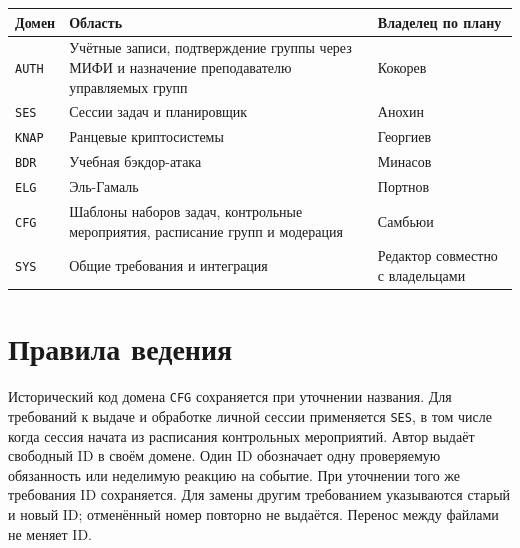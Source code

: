 \documentclass[12pt,a4paper]{article}
\begin{document}
{\def\LTcaptype{none} %
\begin{longtable}[]{@{}
  >{\raggedright\arraybackslash}p{}
  >{\raggedright\arraybackslash}p{}
  >{\raggedright\arraybackslash}p{}@{}}
\toprule\noalign{}
\begin{minipage}[b]{\linewidth}\raggedright
Домен
\end{minipage} & \begin{minipage}[b]{\linewidth}\raggedright
Область
\end{minipage} & \begin{minipage}[b]{\linewidth}\raggedright
Владелец по плану
\end{minipage} \\
\midrule\noalign{}
\endhead
\bottomrule\noalign{}
\endlastfoot
\texttt{AUTH} & Учётные записи, подтверждение группы через МИФИ и назначение преподавателю управляемых групп & Кокорев \\
\texttt{SES} & Сессии задач и планировщик & Анохин \\
\texttt{KNAP} & Ранцевые криптосистемы & Георгиев \\
\texttt{BDR} & Учебная бэкдор-атака & Минасов \\
\texttt{ELG} & Эль-Гамаль & Портнов \\
\texttt{CFG} & Шаблоны наборов задач, контрольные мероприятия, расписание групп и модерация & Самбьюи \\
\texttt{SYS} & Общие требования и интеграция & Редактор совместно с владельцами \\
\end{longtable}
}

\section{Правила ведения}\label{ux43fux440ux430ux432ux438ux43bux430-ux432ux435ux434ux435ux43dux438ux44f}

\hypertarget{правила-ведения}{}

Исторический код домена \texttt{CFG} сохраняется при уточнении названия. Для требований к выдаче и обработке личной сессии применяется \texttt{SES}, в том числе когда сессия начата из расписания контрольных мероприятий. Автор выдаёт свободный ID в своём домене. Один ID обозначает одну проверяемую обязанность или неделимую реакцию на событие. При уточнении того же требования ID сохраняется. Для замены другим требованием указываются старый и новый ID; отменённый номер повторно не выдаётся. Перенос между файлами не меняет ID.
\end{document}
